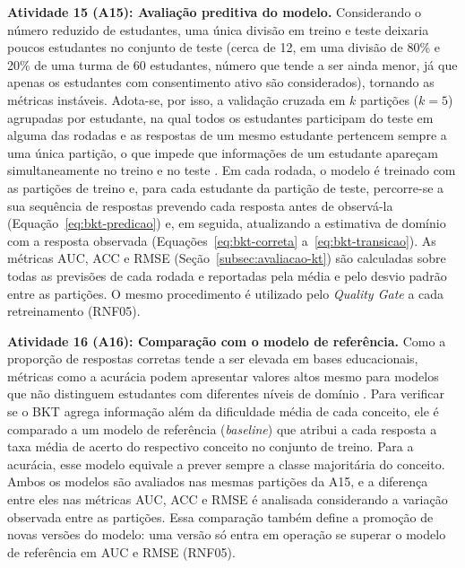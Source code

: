 \textbf{Atividade 15 (A15): Avaliação preditiva do modelo.} Considerando o número reduzido de estudantes, uma única divisão em treino e teste deixaria poucos estudantes no conjunto de teste (cerca de 12, em uma divisão de 80\% e 20\% de uma turma de 60 estudantes, número que tende a ser ainda menor, já que apenas os estudantes com consentimento ativo são considerados), tornando as métricas instáveis. Adota-se, por isso, a validação cruzada em $k$ partições ($k = 5$) agrupadas por estudante, na qual todos os estudantes participam do teste em alguma das rodadas e as respostas de um mesmo estudante pertencem sempre a uma única partição, o que impede que informações de um estudante apareçam simultaneamente no treino e no teste \cite{nagatani_augmenting_2019, cao_multi-granularity_2025}. Em cada rodada, o modelo é treinado com as partições de treino e, para cada estudante da partição de teste, percorre-se a sua sequência de respostas prevendo cada resposta antes de observá-la (Equação~\ref{eq:bkt-predicao}) e, em seguida, atualizando a estimativa de domínio com a resposta observada (Equações~\ref{eq:bkt-correta} a~\ref{eq:bkt-transicao}). As métricas AUC, ACC e RMSE (Seção~\ref{subsec:avaliacao-kt}) são calculadas sobre todas as previsões de cada rodada e reportadas pela média e pelo desvio padrão entre as partições. O mesmo procedimento é utilizado pelo \textit{Quality Gate} a cada retreinamento (RNF05).

\textbf{Atividade 16 (A16): Comparação com o modelo de referência.} Como a proporção de respostas corretas tende a ser elevada em bases educacionais, métricas como a acurácia podem apresentar valores altos mesmo para modelos que não distinguem estudantes com diferentes níveis de domínio \cite{cui_rebalancing_2025}. Para verificar se o BKT agrega informação além da dificuldade média de cada conceito, ele é comparado a um modelo de referência (\textit{baseline}) que atribui a cada resposta a taxa média de acerto do respectivo conceito no conjunto de treino. Para a acurácia, esse modelo equivale a prever sempre a classe majoritária do conceito. Ambos os modelos são avaliados nas mesmas partições da A15, e a diferença entre eles nas métricas AUC, ACC e RMSE é analisada considerando a variação observada entre as partições. Essa comparação também define a promoção de novas versões do modelo: uma versão só entra em operação se superar o modelo de referência em AUC e RMSE (RNF05).

